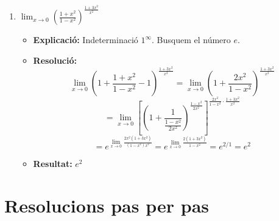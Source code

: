 \documentclass[12pt,a4paper]{article}
\begin{document}
\begin{enumerate}[label=\textbf{7.\arabic*.}]
    \item $\lim_{x \to 0} \left( \frac{1+x^2}{1-x^2} \right)^{\frac{1+3x^2}{x^2}}$
        \begin{itemize}
            \item \textbf{Explicació:} Indeterminació $1^\infty$. Busquem el número $e$.
            \item \textbf{Resolució:}
            $$ \lim_{x \to 0} \left( 1 + \frac{1+x^2}{1-x^2} - 1 \right)^{\frac{1+3x^2}{x^2}} = \lim_{x \to 0} \left( 1 + \frac{2x^2}{1-x^2} \right)^{\frac{1+3x^2}{x^2}} $$
            $$ = \lim_{x \to 0} \left[ \left( 1 + \frac{1}{\frac{1-x^2}{2x^2}} \right)^{\frac{1-x^2}{2x^2}} \right]^{\frac{2x^2}{1-x^2} \cdot \frac{1+3x^2}{x^2}} $$
            $$ = e^{\lim_{x \to 0} \frac{2x^2(1+3x^2)}{(1-x^2)x^2}} = e^{\lim_{x \to 0} \frac{2(1+3x^2)}{1-x^2}} = e^{2/1} = e^2 $$
            \item \textbf{Resultat:} $e^2$
        \end{itemize}
\end{enumerate}

\newpage
\section*{Resolucions pas per pas}
\end{document}
